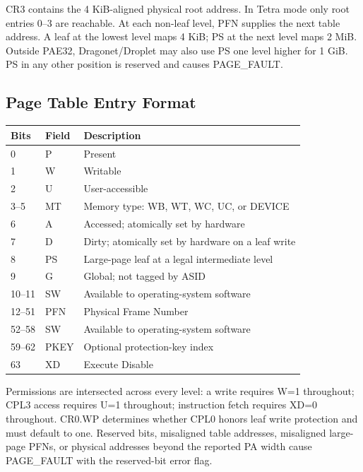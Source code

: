 \documentclass[11pt]{article}
\begin{document}
CR3 contains the 4 KiB-aligned physical root address. In Tetra mode only root entries 0--3 are reachable. At each non-leaf level, PFN supplies the next table address. A leaf at the lowest level maps 4 KiB; PS at the next level maps 2 MiB. Outside PAE32, Dragonet/Droplet may also use PS one level higher for 1 GiB. PS in any other position is reserved and causes PAGE\_FAULT.

\subsection{Page Table Entry Format}

\begin{table}[h]
\centering
\begin{tabular}{@{}lll@{}}
\toprule
\textbf{Bits} & \textbf{Field} & \textbf{Description} \\ \midrule
0 & P & Present \\
1 & W & Writable \\
2 & U & User-accessible \\
3--5 & MT & Memory type: WB, WT, WC, UC, or DEVICE \\
6 & A & Accessed; atomically set by hardware \\
7 & D & Dirty; atomically set by hardware on a leaf write \\
8 & PS & Large-page leaf at a legal intermediate level \\
9 & G & Global; not tagged by ASID \\
10--11 & SW & Available to operating-system software \\
12--51 & PFN & Physical Frame Number \\
52--58 & SW & Available to operating-system software \\
59--62 & PKEY & Optional protection-key index \\
63 & XD & Execute Disable \\ \bottomrule
\end{tabular}
\end{table}

Permissions are intersected across every level: a write requires W=1 throughout; CPL3 access requires U=1 throughout; instruction fetch requires XD=0 throughout. CR0.WP determines whether CPL0 honors leaf write protection and must default to one. Reserved bits, misaligned table addresses, misaligned large-page PFNs, or physical addresses beyond the reported PA width cause PAGE\_FAULT with the reserved-bit error flag.
\end{document}
